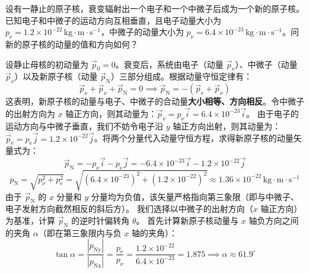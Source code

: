 \begin{example}
设有一静止的原子核，衰变辐射出一个电子和一个中微子后成为一个新的原子核。已知电子和中微子的运动方向互相垂直，且电子动量大小为 $p_{\text{e}} = 1.2 \times 10^{-22}\,\mathrm{kg \cdot m \cdot s^{-1}}$，中微子的动量大小为 $p_{\nu} = 6.4 \times 10^{-23}\,\mathrm{kg \cdot m \cdot s^{-1}}$。问新的原子核的动量的值和方向如何？
\end{example}
\begin{solution}
设静止母核的初动量为 $\vec{p}_0 = 0$。衰变后，系统由电子（动量 $\vec{p}_{\text{e}}$）、中微子（动量 $\vec{p}_{\nu}$）以及新原子核（动量 $\vec{p}_{\text{N}}$）三部分组成。根据动量守恒定律有：
\[\vec{p}_{\text{e}} + \vec{p}_{\nu} + \vec{p}_{\text{N}} = 0 \implies \vec{p}_{\text{N}} = -(\vec{p}_{\text{e}} + \vec{p}_{\nu})\]
这表明，新原子核的动量与电子、中微子的合动量\textbf{大小相等、方向相反}。令中微子的出射方向为 $x$ 轴正方向，则其动量为：$\vec{p}_{\nu} = p_{\nu}\vec{i} = 6.4 \times 10^{-23}\vec{i}$。
由于电子的运动方向与中微子垂直，我们不妨令电子沿 $y$ 轴正方向出射，则其动量为：$\vec{p}_{\text{e}} = p_{\text{e}}\vec{j} = 1.2 \times 10^{-22}\vec{j}$。将两个分量代入动量守恒方程，求得新原子核的动量矢量式为：
\[\vec{p}_{\text{N}} = -p_{\nu}\vec{i} - p_{\text{e}}\vec{j} = -6.4 \times 10^{-23}\vec{i} - 1.2 \times 10^{-22}\vec{j}\]
\[p_{\text{N}} = \sqrt{p_{\nu}^2 + p_{\text{e}}^2} = \sqrt{(6.4 \times 10^{-23})^2 + (1.2 \times 10^{-22})^2} \approx 1.36 \times 10^{-22}\,\mathrm{kg \cdot m \cdot s^{-1}}\]
由于 $\vec{p}_{\text{N}}$ 的 $x$ 分量和 $y$ 分量均为负值，该矢量严格指向第三象限（即与中微子、电子发射方向截然相反的斜后方）。
我们选择以中微子的出射方向（$x$ 轴正方向）为基准，计算 $\vec{p}_{\text{N}}$ 的逆时针偏转角 $\theta$。
首先计算新原子核动量与 $x$ 轴负方向之间的夹角 $\alpha$（即在第三象限内与负 $x$ 轴的夹角）：
\[\tan\alpha = \frac{|p_{\text{Ny}}|}{|p_{\text{Nx}}|} = \frac{p_{\text{e}}}{p_{\nu}} = \frac{1.2 \times 10^{-22}}{6.4 \times 10^{-23}} = 1.875 \implies \alpha \approx 61.9^\circ\]
\end{solution}

